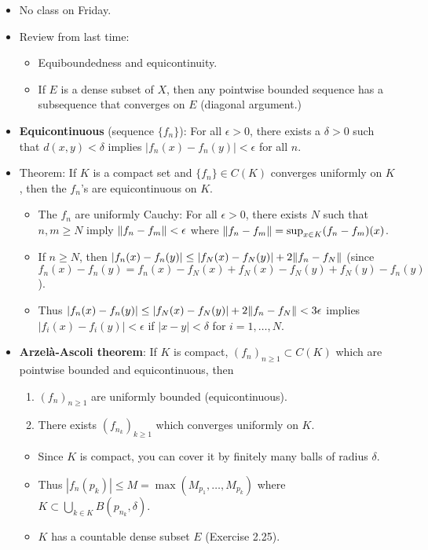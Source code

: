 \documentclass[../../notes.tex]{subfiles}
\begin{document}
\begin{itemize}
    \item No class on Friday.
    \item Review from last time:
    \begin{itemize}
        \item Equiboundedness and equicontinuity.
        \item If $E$ is a dense subset of $X$, then any pointwise bounded sequence has a subsequence that converges on $E$ (diagonal argument.)
    \end{itemize}
    \item \textbf{Equicontinuous} (sequence $\{f_n\}$): For all $\epsilon>0$, there exists a $\delta>0$ such that $d(x,y)<\delta$ implies $|f_n(x)-f_n(y)|<\epsilon$ for all $n$.
    \item Theorem: If $K$ is a compact set and $\{f_n\}\in C(K)$ converges uniformly on $K$, then the $f_n$'s are equicontinuous on $K$.
    \begin{itemize}
        \item The $f_n$ are uniformly Cauchy: For all $\epsilon>0$, there exists $N$ such that $n,m\geq N$ imply $\norm{f_n-f_m}<\epsilon$ where $\norm{f_n-f_m}=\sup_{x\in K}(f_n-f_m)(x)$.
        \item If $n\geq N$, then $|f_n(x)-f_n(y)|\leq|f_N(x)-f_N(y)|+2\norm{f_n-f_N}$ (since $f_n(x)-f_n(y)=f_n(x)-f_N(x)+f_N(x)-f_N(y)+f_N(y)-f_n(y)$).
        \item Thus $|f_n(x)-f_n(y)|\leq|f_N(x)-f_N(y)|+2\norm{f_n-f_N}<3\epsilon$ implies $|f_i(x)-f_i(y)|<\epsilon$ if $|x-y|<\delta$ for $i=1,\dots,N$.
    \end{itemize}
    \item \textbf{Arzel\`{a}-Ascoli theorem}: If $K$ is compact, $(f_n)_{n\geq 1}\subset C(K)$ which are pointwise bounded and equicontinuous, then
    \begin{enumerate}[label={(\alph*)}]
        \item $(f_n)_{n\geq 1}$ are uniformly bounded (equicontinuous).
        \item There exists $(f_{n_k})_{k\geq 1}$ which converges uniformly on $K$.
    \end{enumerate}
    \begin{itemize}
        \item Since $K$ is compact, you can cover it by finitely many balls of radius $\delta$.
        \item Thus $|f_n(p_k)|\leq M=\max(M_{p_1},\dots,M_{p_k})$ where $K\subset\bigcup_{k\in K}B(p_{n_k},\delta)$.
        \item $K$ has a countable dense subset $E$ (Exercise 2.25).

\end{itemize}
\end{itemize}
\end{document}

